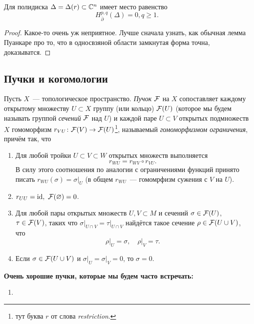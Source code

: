      \begin{theorem} 
        Для полидиска $\Delta = \Delta(r) \subset \mathbb{C}^n$ имеет место равенство 
        \[
           H_{\overline{\partial}}^{p, q}(\Delta) = 0, q \ge 1.
        \]
     \end{theorem}
     \begin{proof}
        \textcolor{Emerald}{Какое-то очень уж неприятное. Лучше сначала узнать, как обычная лемма Пуанкаре про то, что в односвзяной области замкнутая форма точна, доказыватся.}
     \end{proof}

     \subsection{Пучки и когомологии}

     \begin{definition} 
        Пусть $X$~--- топологическое пространство. \emph{Пучок $\mathcal{F}$} на $X$ сопоставляет каждому открытому множеству $U \subset X$ группу (или кольцо) $\mathcal{F}(U)$ (которое мы будем называть группой \emph{сечений} $\mathcal{F}$ над $U$) и каждой паре $U \subset V$ открытых подмножеств $X$ гомоморфизм $r_{VU}\colon \mathcal{F}(V) \to \mathcal{F}(U)$\footnote{тут буква $r$ от слова \emph{restriction}.}, называемый \emph{гомоморфизмом ограничения}, причём так, что

        \begin{enumerate}
           \item Для любой тройки $U \subset V \subset W$ открытых множеств выполняется
           \[
              r_{WU} = r_{WV} \circ r_{VU}.
           \]
           В силу этого соотношения по аналогии с ограничениями функций принято писать $r_{WU}(\sigma) = \sigma\vert_{U}$ (в общем $r_{WU}$~--- гомомрфизм сужения с $V$ на $U$).

           \item $r_{UU} = \operatorname{id}, \ \mathcal{F}(\varnothing) = 0$.

           \item Для любой пары открытых множеств $U, V \subset M$ и сечений $\sigma \in \mathcal{F}(U)$, $\tau \in \mathcal{F}(V)$, таких что $\sigma\vert_{U \cap V} = \tau\vert_{U \cap V}$ найдётся такое сечение $\rho \in \mathcal{F}(U \cup V)$, что 
           \[
              \rho\vert_{U} = \sigma, \quad \rho\vert_{V} = \tau.
           \]
           \item Если $\sigma \in \mathcal{F}(U \cup V)$ и $\sigma\vert_{U} = \sigma\vert_{V} = 0$, то $\sigma = 0$.
        \end{enumerate}
     \end{definition}

     \noindent\bf{Очень хорошие пучки, которые мы будем часто встречать:}

     \begin{enumerate}
        \item 
     \end{enumerate}

